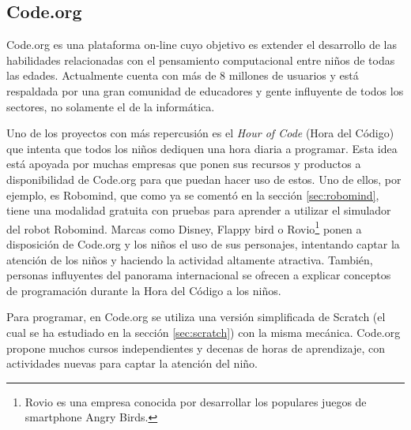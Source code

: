 \subsection{Code.org}
\label{sec:Code.org}

Code.org\cite{code-org} es una plataforma on-line cuyo objetivo es extender el desarrollo de las habilidades relacionadas con el pensamiento computacional entre niños de todas las edades. Actualmente cuenta con más de 8 millones de usuarios y está respaldada por una gran comunidad de educadores y gente influyente de todos los sectores, no solamente el de la informática.

Uno de los proyectos con más repercusión es el \emph{Hour of Code}\cite{hour-of-code} (Hora del Código) que intenta que todos los niños dediquen una hora diaria a programar. Esta idea está apoyada por muchas empresas que ponen sus recursos y productos a disponibilidad de Code.org para que puedan hacer uso de estos. Uno de ellos, por ejemplo, es Robomind, que como ya se comentó en la sección \ref{sec:robomind}, tiene una modalidad gratuita con pruebas para aprender a utilizar el simulador del robot Robomind. Marcas como Disney, Flappy bird o Rovio\footnote{Rovio es una empresa conocida por desarrollar los populares juegos de smartphone Angry Birds.} ponen a disposición de Code.org y los niños el uso de sus personajes, intentando captar la atención de los niños y haciendo la actividad altamente atractiva. También, personas influyentes del panorama internacional se ofrecen a explicar conceptos de programación durante la Hora del Código a los niños. 

Para programar, en Code.org se utiliza una versión simplificada de Scratch (el cual se ha estudiado en la sección \ref{sec:scratch}) con la misma mecánica. Code.org propone muchos cursos independientes y decenas de horas de aprendizaje, con actividades nuevas para captar la atención del niño. 



